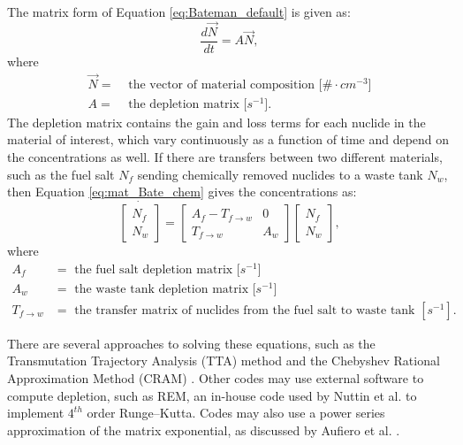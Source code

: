 The matrix form of Equation \eqref{eq:Bateman_default} is given as:
\begin{equation}
    \frac{d\vec{N}}{dt} = A \vec{N},
    \label{eq:mat_Bate}
\end{equation}
where
\begin{align}
    \vec{N} =& \text{ the vector of material composition [$\# \cdot cm^{-3}$]} \nonumber\\
    A =& \text{ the depletion matrix [$s^{-1}$].} \nonumber
\end{align}
The depletion matrix contains the gain and loss terms for each nuclide in the material of interest, which vary continuously as a function of time and depend on the concentrations as well.
If there are transfers between two different materials, such as the fuel salt $N_{f}$ sending chemically removed nuclides to a waste tank $N_{w}$, then Equation \eqref{eq:mat_Bate_chem} gives the concentrations as:
\begin{equation}
    \dot{
    \begin{bmatrix}
    N_{f} \\
    N_{w}
    \end{bmatrix}
    }
    = 
    \begin{bmatrix}
        A_f-T_{f \rightarrow w} & 0 \\
        T_{f \rightarrow w} & A_w
    \end{bmatrix}
        \begin{bmatrix}
    N_{f} \\
    N_{w}
    \end{bmatrix},
    \label{eq:mat_Bate_chem}
\end{equation}
where
\begin{align}
    A_f &= \text{ the fuel salt depletion matrix [$s^{-1}$]} \nonumber \\
    A_w &= \text{ the waste tank depletion matrix [$s^{-1}$]} \nonumber \\
    T_{f \rightarrow w} &= \text{ the transfer matrix of nuclides from the fuel salt to waste tank $[s^{-1}]$} \nonumber .
\end{align}

There are several approaches to solving these equations, such as the Transmutation Trajectory Analysis (TTA) method and the Chebyshev Rational Approximation Method (CRAM) \cite{leppanen_serpent_2015}.
Other codes may use external software to compute depletion, such as REM, an in-house code used by Nuttin et al. \cite{nuttin_potential_2005} to implement $4^{th}$ order Runge–Kutta.
Codes may also use a power series approximation of the matrix exponential, as discussed by Aufiero et al. \cite{aufiero_extended_2013}.




